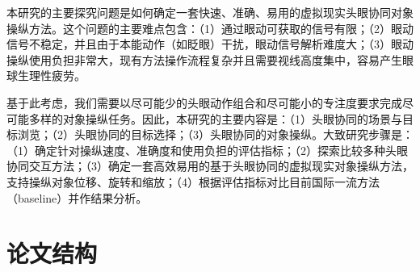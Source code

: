 本研究的主要探究问题是如何确定一套快速、准确、易用的虚拟现实头眼协同对象操纵方法。这个问题的主要难点包含：（1）通过眼动可获取的信号有限；（2）眼动信号不稳定，并且由于本能动作（如眨眼）干扰，眼动信号解析难度大；（3）眼动操纵使用负担非常大，现有方法操作流程复杂并且需要视线高度集中，容易产生眼球生理性疲劳。

基于此考虑，我们需要以尽可能少的头眼动作组合和尽可能小的专注度要求完成尽可能多样的对象操纵任务。因此，本研究的主要内容是：（1）头眼协同的场景与目标浏览；（2）头眼协同的目标选择；（3）头眼协同的对象操纵。大致研究步骤是：（1）确定针对操纵速度、准确度和使用负担的评估指标；（2）探索比较多种头眼协同交互方法；（3）确定一套高效易用的基于头眼协同的虚拟现实对象操纵方法，支持操纵对象位移、旋转和缩放；（4）根据评估指标对比目前国际一流方法（baseline）并作结果分析。

\section{论文结构}

